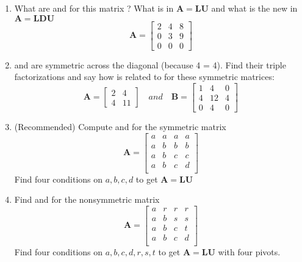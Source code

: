\begin{itemize}
\begin{enumerate}
      \item What are  and  for this matrix ? What is  in
        \(\bm{A} = \bm{LU}\) and what is the new  in \( \bm{A} = \bm{LDU} \)
        \[%
        \bm{A} = \begin{bmatrix}
        2 & 4 & 8 \\
        0 & 3 & 9 \\
        0 & 0 & 0
        \end{bmatrix}
        \]%

      \item {} and  are symmetric across the diagonal (because 4 =
        4). Find their triple factorizations  and say how  is
        related to  for these symmetric matrices:
        \[%
        \bm{A} = \begin{bmatrix}
        2 & 4 \\
        4 & 11
        \end{bmatrix} \quad and \quad
        \bm{B} =
        \begin{bmatrix}
        1 & 4 & 0 \\
        4 & 12 & 4 \\
        0 & 4 & 0
        \end{bmatrix}
        \]%

      \item (Recommended) Compute  and  for the symmetric matrix
        \[%
        \bm{A} = \begin{bmatrix}
          a & a & a & a \\
          a & b & b & b \\
          a & b & c & c \\
          a & b & c & d \\
        \end{bmatrix}
        \]%
        Find four conditions on \( a,b,c,d \) to get \( \bm{A} = \bm{LU} \)

      \item Find  and  for the nonsymmetric matrix
        \[%
        \bm{A} = \begin{bmatrix}
          a & r & r & r \\
          a & b & s & s \\
          a & b & c & t \\
          a & b & c & d \\
        \end{bmatrix}
        \]%
        Find four conditions on \( a,b,c,d,r,s,t \) to get \( \bm{A} = \bm{LU}
        \) with four pivots.


\end{enumerate}
\end{itemize}
